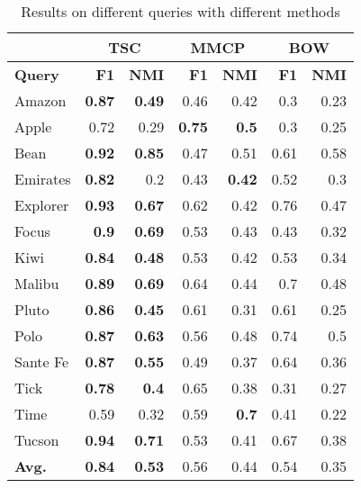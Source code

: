 \begin{table}[th]
\centering \scriptsize
\caption{Results on different queries with different methods}
\begin{tabular}{|l|r|r|r|r|r|r|}
\hline
    {\bf } & \multicolumn{ 2}{|c|}{{\bf TSC}} & \multicolumn{ 2}{|c|}{{\bf MMCP}} & \multicolumn{ 2}{|c|}{{\bf BOW}} \\
\hline
{\bf Query} &   {\bf F1} &  {\bf NMI} &   {\bf F1} &  {\bf NMI} &   {\bf F1} &  {\bf NMI} \\
\hline
    Amazon & {\bf 0.87} & {\bf 0.49} &       0.46 &       0.42 &        0.3 &       0.23 \\
\hline
     Apple &       0.72 &       0.29 & {\bf 0.75} &  {\bf 0.5} &        0.3 &       0.25 \\
\hline
      Bean & {\bf 0.92} & {\bf 0.85} &       0.47 &       0.51 &       0.61 &       0.58 \\
\hline
  Emirates & {\bf 0.82} &        0.2 &       0.43 & {\bf 0.42} &       0.52 &        0.3 \\
\hline
  Explorer & {\bf 0.93} & {\bf 0.67} &       0.62 &       0.42 &       0.76 &       0.47 \\
\hline
     Focus &  {\bf 0.9} & {\bf 0.69} &       0.53 &       0.43 &       0.43 &       0.32 \\
\hline
      Kiwi & {\bf 0.84} & {\bf 0.48} &       0.53 &       0.42 &       0.53 &       0.34 \\
\hline
    Malibu & {\bf 0.89} & {\bf 0.69} &       0.64 &       0.44 &        0.7 &       0.48 \\
\hline
     Pluto & {\bf 0.86} & {\bf 0.45} &       0.61 &       0.31 &       0.61 &       0.25 \\
\hline
      Polo & {\bf 0.87} & {\bf 0.63} &       0.56 &       0.48 &       0.74 &        0.5 \\
\hline
  Sante Fe & {\bf 0.87} & {\bf 0.55} &       0.49 &       0.37 &       0.64 &       0.36 \\
\hline
      Tick & {\bf 0.78} &  {\bf 0.4} &       0.65 &       0.38 &       0.31 &       0.27 \\
\hline
      Time &      0.59  &       0.32 &       0.59 &  {\bf 0.7} &       0.41 &       0.22 \\
\hline
    Tucson & {\bf 0.94} & {\bf 0.71} &       0.53 &       0.41 &       0.67 &       0.38 \\
\hline
{\bf Avg.} & {\bf 0.84} & {\bf 0.53} &      0.56  &      0.44  &      0.54  &      0.35  \\
\hline
\end{tabular}
\label{tab:result}
\end{table}

